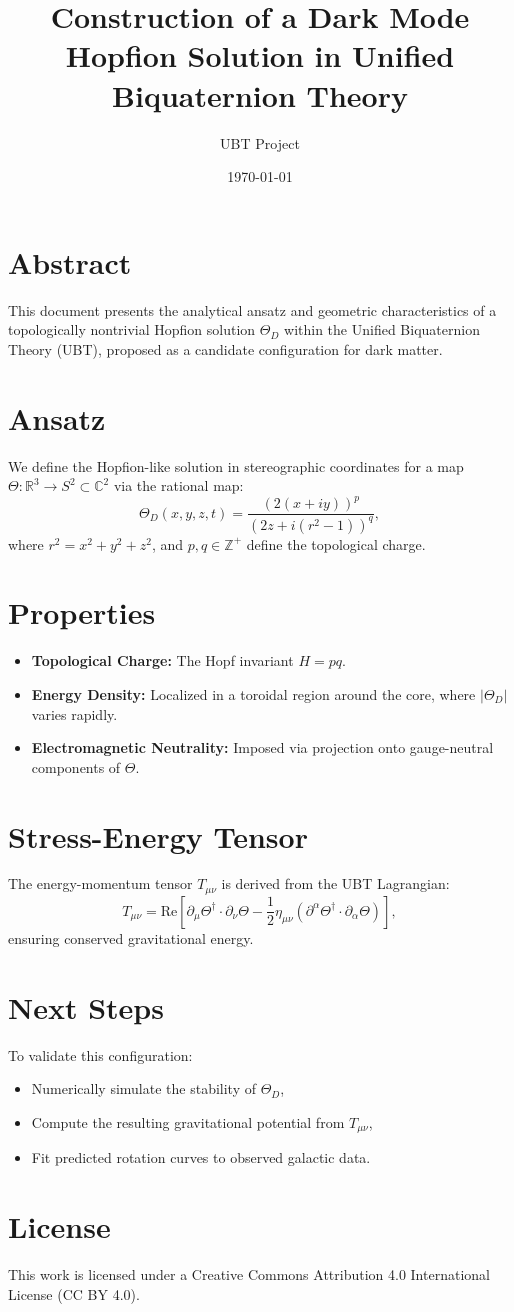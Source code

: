 \documentclass[12pt]{article}
\title{Construction of a Dark Mode Hopfion Solution in Unified Biquaternion Theory}
\author{UBT Project}
\date{\today}
\begin{document}
\maketitle

\section*{Abstract}
This document presents the analytical ansatz and geometric characteristics of a topologically nontrivial Hopfion solution \(\Theta_D\) within the Unified Biquaternion Theory (UBT), proposed as a candidate configuration for dark matter.

\section{Ansatz}
We define the Hopfion-like solution in stereographic coordinates for a map \( \Theta : \mathbb{R}^3 \to S^2 \subset \mathbb{C}^2 \) via the rational map:
\[
\Theta_D(x, y, z, t) = \frac{(2(x+iy))^p}{(2z + i(r^2 - 1))^q},
\]
where \( r^2 = x^2 + y^2 + z^2 \), and \(p, q \in \mathbb{Z}^+\) define the topological charge.

\section{Properties}
\begin{itemize}
    \item \textbf{Topological Charge:} The Hopf invariant \(H = pq\).
    \item \textbf{Energy Density:} Localized in a toroidal region around the core, where \(|\Theta_D|\) varies rapidly.
    \item \textbf{Electromagnetic Neutrality:} Imposed via projection onto gauge-neutral components of \(\Theta\).
\end{itemize}

\section{Stress-Energy Tensor}
The energy-momentum tensor \(T_{\mu\nu}\) is derived from the UBT Lagrangian:
\[
T_{\mu\nu} = \text{Re} \left[ \partial_\mu \Theta^\dagger \cdot \partial_\nu \Theta - \frac{1}{2} \eta_{\mu\nu} \left( \partial^\alpha \Theta^\dagger \cdot \partial_\alpha \Theta \right) \right],
\]
ensuring conserved gravitational energy.

\section{Next Steps}
To validate this configuration:
\begin{itemize}
    \item Numerically simulate the stability of \(\Theta_D\),
    \item Compute the resulting gravitational potential from \(T_{\mu\nu}\),
    \item Fit predicted rotation curves to observed galactic data.
\end{itemize}


\section*{License}
This work is licensed under a Creative Commons Attribution 4.0 International License (CC BY 4.0).
\end{document}
